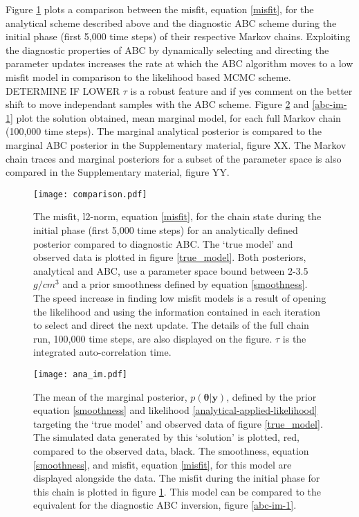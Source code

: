 Figure \ref{comparison-1} plots a comparison between the misfit, equation \ref{misfit}, for the analytical scheme described above and the diagnostic ABC scheme during the initial phase (first 5,000 time steps) of their respective Markov chains. Exploiting the diagnostic properties of ABC by dynamically selecting and directing the parameter updates increases the rate at which the ABC algorithm moves to a low misfit model in comparison to the likelihood based MCMC scheme. DETERMINE IF LOWER $\tau$ is a robust feature and if yes comment on the better shift to move independant samples with the ABC scheme. Figure \ref{ana-im-1} and \ref{abc-im-1} plot the solution obtained, mean marginal model, for each full Markov chain (100,000 time steps). The marginal analytical posterior is compared to the marginal ABC posterior in the Supplementary material, figure XX. The Markov chain traces and marginal posteriors for a subset of the parameter space is also compared in the Supplementary material, figure YY.\par

\begin{figure}[H]
	\centering
	\texttt{[image: comparison.pdf]}
	\caption{The misfit, l2-norm, equation \ref{misfit}, for the chain state during the initial phase (first 5,000 time steps) for an analytically defined posterior compared to diagnostic ABC. The `true model' and observed data is plotted in figure \ref{true_model}. Both posteriors, analytical and ABC, use a parameter space bound between 2-3.5 $g/cm^3$ and a prior smoothness defined by equation \ref{smoothness}. The speed increase in finding low misfit models is a result of opening the likelihood and using the information contained in each iteration to select and direct the next update. The details of the full chain run, 100,000 time steps, are also displayed on the figure. $\tau$ is the integrated auto-correlation time.}
	\label{comparison-1}
\end{figure}

\begin{figure}[H]
	\centering
	\texttt{[image: ana\_im.pdf]}
	\caption{The mean of the marginal posterior, $p(\bm{\theta}|\bm{y})$, defined by the prior equation \ref{smoothness} and likelihood \ref{analytical-applied-likelihood} targeting the `true model' and observed data of figure \ref{true_model}. The simulated data generated by this `solution' is plotted, red, compared to the observed data, black. The smoothness, equation \ref{smoothness}, and misfit, equation \ref{misfit}, for this model are displayed alongside the data. The misfit during the initial phase for this chain is plotted in figure \ref{comparison-1}. This model can be compared to the equivalent for the diagnostic ABC inversion, figure \ref{abc-im-1}.}
	\label{ana-im-1}
\end{figure}

